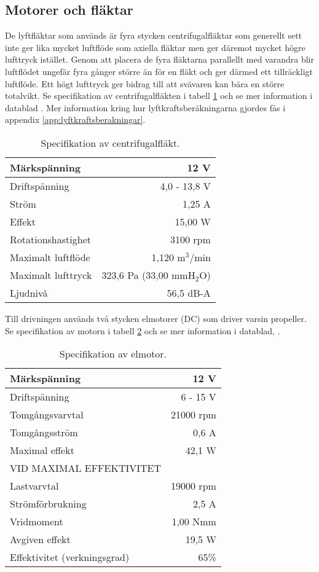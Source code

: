 \subsection{Motorer och fläktar}
De lyftfläktar som används är fyra stycken centrifugalfläktar som generellt sett
inte ger lika mycket luftflöde som axiella fläktar men ger däremot mycket högre
lufttryck istället. Genom att placera de fyra fläktarna parallellt med varandra
blir luftflödet ungefär fyra gånger större än för en fläkt och ger därmed ett
tillräckligt luftflöde. Ett högt lufttryck ger bidrag till att svävaren kan bära
en större totalvikt. Se specifikation av centrifugalfläkten i tabell
\ref{tbl:fan_spec} och se mer information i datablad \cite{Delta_BFB1212VH-R00}
. Mer information kring hur lyftkraftsberäkningarna gjordes fås i appendix
\ref{app:lyftkraftsberakningar}.

\begin{table}[htbp!]
\centering
\caption{Specifikation av centrifugalfläkt.}
\label{tbl:fan_spec}
\begin{tabular}{|l|r|}
\hline
Märkspänning & 12 V\\
\hline
Driftspänning & 4,0 - 13,8 V\\
\hline
Ström & 1,25 A\\
\hline
Effekt & 15,00 W\\
\hline
Rotationshastighet & 3100 rpm\\
\hline
Maximalt luftflöde & 1,120 m$^3$/min\\
\hline
Maximalt lufttryck & 323,6 Pa (33,00 mmH$_2$O)\\
\hline
Ljudnivå & 56,5 dB-A\\
\hline
\end{tabular}
\end{table}

Till drivningen används två stycken elmotorer (DC) som driver varsin propeller.
Se specifikation av motorn i tabell \ref{tbl:motor_spec} och se mer information
i datablad, \cite{Motraxx_XFLY400-12}.

\begin{table}[htbp!]
\centering
\caption{Specifikation av elmotor.}
\label{tbl:motor_spec}
\begin{tabular}{|l|r|}
\hline
Märkspänning & 12 V\\
\hline
Driftspänning & 6 - 15 V\\
\hline
Tomgångsvarvtal & 21000 rpm\\
\hline
Tomgångsström & 0,6 A\\
\hline
Maximal effekt & 42,1 W\\
\hline
VID MAXIMAL EFFEKTIVITET &\\
\hline
Lastvarvtal & 19000 rpm\\
\hline
Strömförbrukning & 2,5 A\\
\hline
Vridmoment & 1,00 Nmm\\
\hline
Avgiven effekt & 19,5 W\\
\hline
Effektivitet (verkningsgrad) & 65\%\\
\hline
\end{tabular}	
\end{table}

